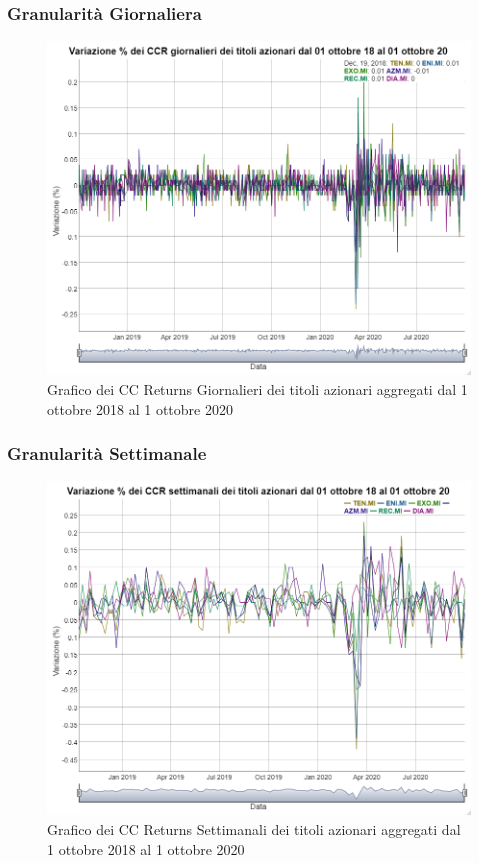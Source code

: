 \documentclass[12pt]{article}
\begin{document}
\subsubsection{Granularità Giornaliera}
\begin{figure}[!htb]
    \centering
    \includegraphics[width=1\textwidth]{immagini/ccrdaily.png}
    \caption{Grafico dei CC Returns Giornalieri dei titoli azionari aggregati dal 1 ottobre 2018 al 1 ottobre 2020}
\end{figure}
\FloatBarrier
\newpage
\subsubsection{Granularità Settimanale}
\begin{figure}[!htb]
    \centering
    \includegraphics[width=1\textwidth]{immagini/ccrweekly.png}
    \caption{Grafico dei CC Returns Settimanali dei titoli azionari aggregati dal 1 ottobre 2018 al 1 ottobre 2020}
\end{figure}
\FloatBarrier
\newpage
\end{document}
